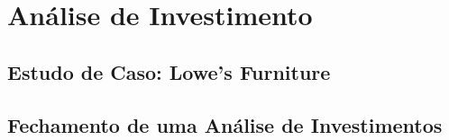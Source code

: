 \chapter{Análise de Investimento}
\section{Estudo de Caso: Lowe's Furniture}

\section{Fechamento de uma Análise de Investimentos}
